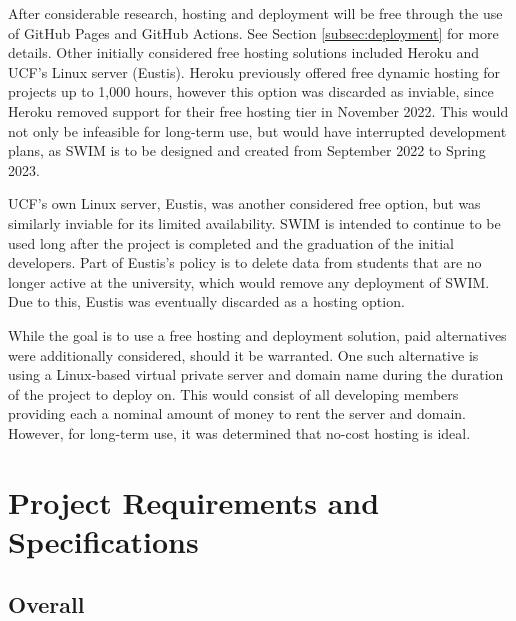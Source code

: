 \documentclass[
    paper=letter,
    parskip=half,
    fontsize=12pt,
    titlepage=firstiscover,
    toc=bibliography,
    numbers=endperiod
]{scrartcl}
\let\oldsection\section
\renewcommand{\section}{\newpage\oldsection}
\begin{document}
After considerable research, hosting and deployment will be free through
the use of GitHub Pages and GitHub Actions. See Section
\ref{subsec:deployment} for more details. Other initially considered
free hosting solutions included Heroku and UCF's Linux server (Eustis).
Heroku previously offered free dynamic hosting for projects up to 1,000
hours, however this option was discarded as inviable, since Heroku
removed support for their free hosting tier in November 2022. This would
not only be infeasible for long-term use, but would have interrupted
development plans, as SWIM is to be designed and created from September
2022 to Spring 2023.

UCF's own Linux server, Eustis, was another considered free option, but
was similarly inviable for its limited availability. SWIM is intended to
continue to be used long after the project is completed and the
graduation of the initial developers. Part of Eustis's policy is to
delete data from students that are no longer active at the university,
which would remove any deployment of SWIM. Due to this, Eustis was
eventually discarded as a hosting option.

While the goal is to use a free hosting and deployment solution, paid
alternatives were additionally considered, should it be warranted. One
such alternative is using a Linux-based virtual private server and
domain name during the duration of the project to deploy on. This would
consist of all developing members providing each a nominal amount of
money to rent the server and domain. However, for long-term use, it was
determined that no-cost hosting is ideal.

\section{Project Requirements and Specifications}
\subsection{Overall}
\end{document}
